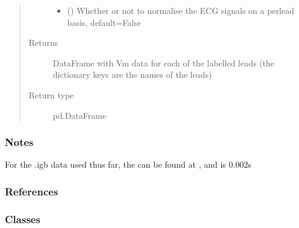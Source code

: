 \documentclass[letterpaper,10pt,english]{sphinxmanual}
\begin{document}
\begin{fulllineitems}
\begin{quote}
\begin{description}
\begin{itemize}
\item {} 
\sphinxAtStartPar
{} (\sphinxstyleliteralemphasis{\sphinxupquote{, }}) \textendash{} Whether or not to normalise the ECG signals on a per\sphinxhyphen{}lead basis, default=False

\end{itemize}

\item[{Returns}] \leavevmode
\sphinxAtStartPar
{} \textendash{} DataFrame with Vm data for each of the labelled leads (the dictionary keys are the names of the leads)

\item[{Return type}] \leavevmode
\sphinxAtStartPar
pd.DataFrame

\end{description}\end{quote}
\subsubsection*{Notes}

\sphinxAtStartPar
For the .igb data used thus far, the  can be found at , and  is
0.002s
\subsubsection*{References}

\sphinxAtStartPar
{}

\end{fulllineitems}

\subsubsection*{Classes}
\end{document}
